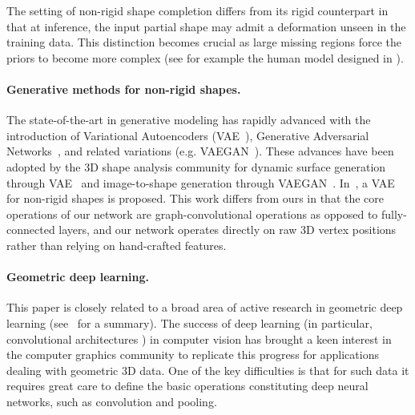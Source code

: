 \documentclass[10pt,twocolumn,letterpaper]{article}
\begin{document}
The setting of non-rigid shape completion differs from its rigid counterpart in that at inference, the input partial shape may admit a deformation unseen in the training data. This distinction becomes crucial as large missing regions force the priors to become more complex (see for example the human model designed in \cite{anguelov2005scape}).

\paragraph{Generative methods for non-rigid shapes.} 
The state-of-the-art in generative modeling has rapidly advanced with the introduction of Variational Autoencoders (VAE~\cite{kingma2014iclr}), Generative Adversarial Networks~\cite{goodfellow2014generative}, and related variations (e.g. VAEGAN~\cite{larsen16icml}). These advances have been adopted by the 3D shape analysis community for dynamic surface generation through VAE~\cite{kostrikov2017surfnet} and image-to-shape generation through VAEGAN~\cite{wu16nips}. In~\cite{tan2017variational}, a VAE for non-rigid shapes is proposed. This work differs from ours in that the core operations of our network are graph-convolutional operations as opposed to fully-connected layers, and our network operates directly on raw 3D vertex positions rather than relying on hand-crafted features.

\paragraph{Geometric deep learning.} 
This paper is closely related to a broad area of active research in geometric deep learning (see~\cite{gdl} for a summary). The success of deep learning (in particular, convolutional architectures \cite{lecun1998gradient}) in computer vision has brought a keen interest in the computer graphics community to replicate this progress for applications dealing with geometric 3D data. One of the key difficulties is that for such data it requires great care to define the basic operations constituting deep neural networks, such as convolution and pooling.
\end{document}
